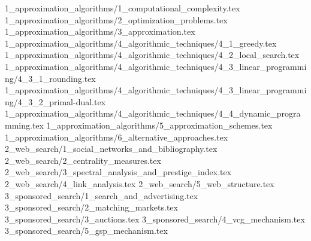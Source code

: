 \documentclass{article}
\begin{document}
	\tableofcontents
	\newpage
	{1_approximation_algorithms/1_computational_complexity.tex}
	{1_approximation_algorithms/2_optimization_problems.tex}
	{1_approximation_algorithms/3_approximation.tex}
	{1_approximation_algorithms/4_algorithmic_techniques/4_1_greedy.tex}
	{1_approximation_algorithms/4_algorithmic_techniques/4_2_local_search.tex}
	{1_approximation_algorithms/4_algorithmic_techniques/4_3_linear_programming/4_3_1_rounding.tex}
	{1_approximation_algorithms/4_algorithmic_techniques/4_3_linear_programming/4_3_2_primal-dual.tex}
	{1_approximation_algorithms/4_algorithmic_techniques/4_4_dynamic_programming.tex}
	{1_approximation_algorithms/5_approximation_schemes.tex}
	{1_approximation_algorithms/6_alternative_approaches.tex}
	{2_web_search/1_social_networks_and_bibliography.tex}
	{2_web_search/2_centrality_measures.tex}
	{2_web_search/3_spectral_analysis_and_prestige_index.tex}
	{2_web_search/4_link_analysis.tex}
	{2_web_search/5_web_structure.tex}
	{3_sponsored_search/1_search_and_advertising.tex}
	{3_sponsored_search/2_matching_markets.tex}
	{3_sponsored_search/3_auctions.tex}
	{3_sponsored_search/4_vcg_mechanism.tex}
	{3_sponsored_search/5_gsp_mechanism.tex}
\end{document}
